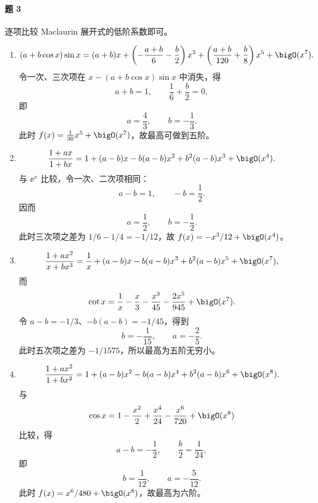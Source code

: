 \paragraph{题 3}
\begin{xsolution}
逐项比较 Maclaurin 展开式的低阶系数即可。
\begin{enumerate}[label=(\arabic*)]
  \item
  \[
    (a+b\cos x)\sin x
    =(a+b)x+\left(-\frac{a+b}{6}-\frac b2\right)x^3
    +\left(\frac{a+b}{120}+\frac b8\right)x^5+\bigO(x^7).
  \]
  令一次、三次项在 $x-(a+b\cos x)\sin x$ 中消失，得
  \[
    a+b=1,\qquad \frac16+\frac b2=0,
  \]
  即
  \[
    a=\frac43,\qquad b=-\frac13.
  \]
  此时 $f(x)=\frac1{30}x^5+\bigO(x^7)$，故最高可做到五阶。

  \item
  \[
    \frac{1+ax}{1+bx}
    =1+(a-b)x-b(a-b)x^2+b^2(a-b)x^3+\bigO(x^4).
  \]
  与 $\ee^x$ 比较，令一次、二次项相同：
  \[
    a-b=1,\qquad -b=\frac12.
  \]
  因而
  \[
    a=\frac12,\qquad b=-\frac12.
  \]
  此时三次项之差为 $1/6-1/4=-1/12$，故 $f(x)=-x^3/12+\bigO(x^4)$。

  \item
  \[
    \frac{1+ax^2}{x+bx^3}
    =\frac1x+(a-b)x-b(a-b)x^3+b^2(a-b)x^5+\bigO(x^7),
  \]
  而
  \[
    \cot x=\frac1x-\frac x3-\frac{x^3}{45}-\frac{2x^5}{945}+\bigO(x^7).
  \]
  令 $a-b=-1/3$、$-b(a-b)=-1/45$，得到
  \[
    b=-\frac1{15},\qquad a=-\frac25.
  \]
  此时五次项之差为 $-1/1575$，所以最高为五阶无穷小。

  \item
  \[
    \frac{1+ax^2}{1+bx^2}
    =1+(a-b)x^2-b(a-b)x^4+b^2(a-b)x^6+\bigO(x^8).
  \]
  与
  \[
    \cos x=1-\frac{x^2}{2}+\frac{x^4}{24}-\frac{x^6}{720}+\bigO(x^8)
  \]
  比较，得
  \[
    a-b=-\frac12,\qquad \frac b2=\frac1{24},
  \]
  即
  \[
    b=\frac1{12},\qquad a=-\frac5{12}.
  \]
  此时 $f(x)=x^6/480+\bigO(x^8)$，故最高为六阶。
\end{enumerate}
\end{xsolution}

